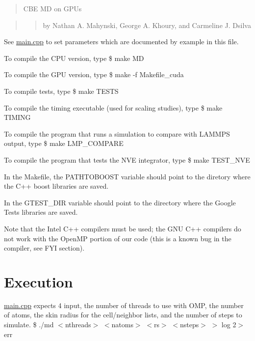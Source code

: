 \begin{quotation}
C\-B\-E M\-D on G\-P\-Us

\end{quotation}


\begin{quotation}
\begin{quotation}
by Nathan A. Mahynski, George A. Khoury, and Carmeline J. Dsilva

\end{quotation}


\end{quotation}


See \hyperlink{main_8cpp_source}{main.\-cpp} to set parameters which are documented by example in this file.

To compile the C\-P\-U version, type \$ make M\-D

To compile the G\-P\-U version, type \$ make -\/f Makefile\-\_\-cuda

To compile tests, type \$ make T\-E\-S\-T\-S

To compile the timing executable (used for scaling studies), type \$ make T\-I\-M\-I\-N\-G

To compile the program that runs a simulation to compare with L\-A\-M\-M\-P\-S output, type \$ make L\-M\-P\-\_\-\-C\-O\-M\-P\-A\-R\-E

To compile the program that tests the N\-V\-E integrator, type \$ make T\-E\-S\-T\-\_\-\-N\-V\-E

In the Makefile, the P\-A\-T\-H\-T\-O\-B\-O\-O\-S\-T variable should point to the diretory where the C++ boost libraries are saved.

In the G\-T\-E\-S\-T\-\_\-\-D\-I\-R variable should point to the directory where the Google Tests libraries are saved.

Note that the Intel C++ compilers must be used; the G\-N\-U C++ compilers do not work with the Open\-M\-P portion of our code (this is a known bug in the compiler, see F\-Y\-I section).

\section*{Execution}

\hyperlink{main_8cpp_source}{main.\-cpp} expects 4 input, the number of threads to use with O\-M\-P, the number of atoms, the skin radius for the cell/neighbor lists, and the number of steps to simulate. \$ ./md $<$nthreads$>$ $<$natoms$>$ $<$rs$>$ $<$nsteps$>$ $>$ log 2$>$ err


